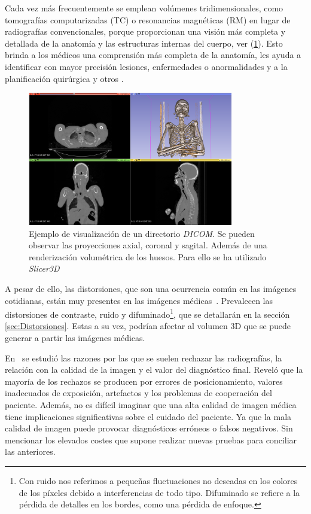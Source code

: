 Cada vez más frecuentemente se emplean volúmenes tridimensionales, como tomografías computarizadas (TC) o 
resonancias magnéticas (RM) en lugar de radiografías convencionales, porque 
proporcionan una visión más completa y detallada de la anatomía y las estructuras 
internas del cuerpo, ver (\ref{fig:SlicerVisualization}). 
Esto brinda a los médicos una comprensión más completa de la anatomía,
les ayuda a identificar con mayor precisión lesiones, enfermedades o anormalidades y a 
la planificación quirúrgica y otros
\cite{3DImagingInMedicine, 3DImagingInMedicine2, ADAS3D}.
 
\begin{figure}[htp]
  \begin{center}
    \includegraphics[width=0.8\textwidth]{imagenes/chapter1/SlicerVisualization}
  \end{center}
  \caption{Ejemplo de visualización de un directorio \emph{DICOM}. Se pueden observar
  las proyecciones axial, coronal y sagital. Además de una renderización volumétrica
  de los huesos. Para ello se ha utilizado \emph{Slicer3D}~\cite{Slicer3D}}
  \label{fig:SlicerVisualization}
\end{figure}

A pesar de ello, las distorsiones, que son una ocurrencia común en las imágenes cotidianas, 
están muy presentes en las imágenes médicas~\cite{MedicalImpactOfDistortions}.
Prevalecen las distorsiones de contraste, ruido y difuminado\footnote{
  Con ruido nos referimos a pequeñas fluctuaciones no deseadas en los colores de 
  los píxeles debido a interferencias de todo tipo. Difuminado se refiere a la 
  pérdida de detalles en los bordes, como una pérdida de enfoque.
}, 
que se detallarán en la sección \ref{sec:Distorsiones}.
Estas a su vez, podrían afectar al volumen 3D que se puede generar a partir 
las imágenes médicas. 
 
En~\cite{XrayRejectionFactor} se estudió las razones por las que se suelen 
rechazar las radiografías, la relación con la calidad de la imagen y el valor
del diagnóstico final. Reveló que la mayoría de los rechazos se producen por 
errores de posicionamiento, valores inadecuados de exposición, artefactos 
y los problemas de cooperación del paciente. 
Además, no es difícil imaginar que una alta 
calidad de imagen médica tiene implicaciones significativas sobre el cuidado
del paciente. Ya que la mala calidad de imagen puede provocar diagnósticos erróneos 
o falsos negativos. Sin mencionar los elevados costes que supone realizar 
nuevas pruebas para conciliar las anteriores.
 
